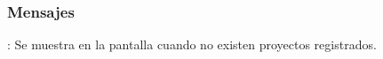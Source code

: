 \subsubsection{Mensajes}

\begin{Citemize}
	\item {}: Se muestra en la pantalla  cuando no existen proyectos registrados.
\end{Citemize}

